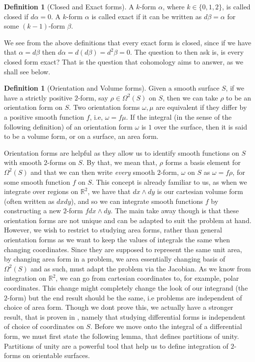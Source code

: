 \documentclass[11pt]{report}
\theoremstyle{definition}
\newtheorem{defn}[thm]{Definition}
\begin{document}
\begin{defn}[Closed and Exact forms]
  A $k$-form $\alpha$, where $k \in \{0,1,2\}$, is called closed if $d\alpha = 0$. A $k$-form $\alpha$ is called exact if it can be written as $d\beta = \alpha$ for some $(k-1)$-form $\beta$.
\end{defn}
We see from the above definitions that every exact form is closed, since if we have that $\alpha = d\beta $ then $d\alpha = d(d\beta) = d^2\beta = 0$. The question to then ask is, is every closed form exact? That is the question that cohomology aims to answer, as we shall see below.
\begin{defn}[Orientation and Volume forms]\label{volumeform}
  Given a smooth surface $S$, if we have a strictly positive $2$-form, say $\rho \in \Omega^2(S)$ on $S$, then we can take $\rho$ to be an orientation form on $S$. Two orientation forms $\omega, \mu$ are equivalent if they differ by a positive smooth function $f$, i.e, $\omega = f\mu$. If the integral (in the sense of the following definition) of an orientation form $\omega$ is $1$ over the surface, then it is said to be a volume form, or on a surface, an area form.
\end{defn}
Orientation forms are helpful as they allow us to identify smooth functions on $S$ with smooth $2$-forms on $S$. By that, we mean that, $\rho$ forms a basis element for $\Omega^2(S)$ and that we can then write \emph{every} smooth $2$-form, $\omega$ on $S$ as $\omega = f\rho$, for some smooth function $f$ on $S$. This concept is already familiar to us, as when we integrate over regions on $\mathbb{R}^2$, we have that $dx\wedge dy$ is our cartesian volume form (often written as $dxdy$), and so we can integrate smooth functions $f$ by constructing a new $2$-form $fdx\wedge dy$. The main take away though is that these orientation forms are not unique and can be adapted to suit the problem at hand. However, we wish to restrict to studying area forms, rather than general orientation forms as we want to keep the values of integrals the same when changing coordinates. Since they are supposed to represent the same unit area, by changing area form in a problem, we area essentially changing basis of $\Omega^2(S)$ and as such, must adapt the problem via the Jacobian. As we know from integration on $\mathbb{R}^2$, we can go from cartesian coordinates to, for example, polar coordinates. This change might completely change the look of our integrand (the $2$-form) but the end result should be the same, i.e problems are independent of choice of area form. Though we dont prove this, we actually have a stronger result, that is proven in \cite{calcohomo}, namely that studying differential forms is independent of choice of coordinates on $S$. Before we move onto the integral of a differential form, we must first state the following lemma, that defines partitions of unity. Partitions of unity are a powerful tool that help us to define integration of $2$-forms on orientable surfaces.
\end{document}
